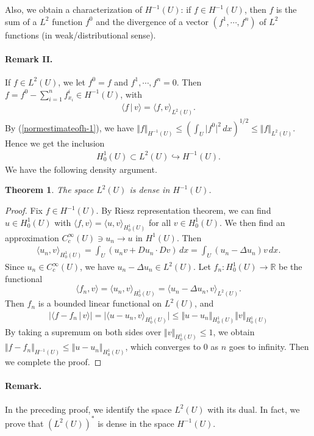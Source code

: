 \documentclass{article}
\numberwithin{equation}{section}
\newcommand{\bbR}{\mathbb{R}}
\theoremstyle{plain}
\newtheorem{theorem}{Theorem}[section]
\theoremstyle{definition}
\begin{document}
Also, we obtain a characterization of $H^{-1}(U)$: if $f\in H^{-1}(U)$, then $f$ is the sum of a $L^2$ function $f^0$ and the divergence of a vector $(f^1,\cdots,f^n)$ of $L^2$ functions (in weak/distributional sense). 

\paragraph{Remark II.} If $f\in L^2(U)$, we let $f^0=f$ and $f^1,\cdots,f^n=0$. Then $f=f^0-\sum_{i=1}^n f_{x_i}^i\in H^{-1}(U)$, with
\begin{align*}
	\langle f\,|\,v\rangle=\langle f,v\rangle_{L^2(U)}.
\end{align*}
By (\ref{normestimateofh-1}), we have $\Vert f\Vert_{H^{-1}(U)}\leq\left(\int_U\vert f^0\vert^2\,dx\right)^{1/2}\leq\Vert f\Vert_{L^2(U)}$. Hence we get the inclusion
\begin{align*}
	H^1_0(U)\subset L^2(U)\hookrightarrow H^{-1}(U).
\end{align*}
We have the following density argument.

\begin{theorem}
The space $L^2(U)$ is dense in $H^{-1}(U)$.
\end{theorem}
\begin{proof}
Fix $f\in H^{-1}(U)$. By Riesz representation theorem, we can find $u\in H_0^1(U)$ with $\langle f,v\rangle=\langle u,v\rangle_{H_0^1(U)}$ for all $v\in H_0^1(U)$. We then find an approximation $C_c^\infty(U)\ni u_n\to u$ in $H^1(U)$. Then
\begin{align*}
	\langle u_n,v\rangle_{H_0^1(U)}=\int_U(u_nv+Du_n\cdot Dv)\,dx=\int_U(u_n-\Delta u_n)v\,dx.\tag{integration by parts}
\end{align*}
Since $u_n\in C_c^\infty(U)$, we have $u_n-\Delta u_n\in L^2(U)$. Let $f_n:H_0^1(U)\to\bbR$ be the functional $$\langle f_n,v\rangle=\langle u_n,v\rangle_{H_0^1(U)}=\langle u_n-\Delta u_n,v\rangle_{L^2(U)}.$$ 
Then $f_n$ is a bounded linear functional on $L^2(U)$, and
\begin{align*}
	\vert\langle f-f_n\,|\,v\rangle\vert=\vert\langle u-u_n,v\rangle_{H_0^1(U)}\vert\leq\Vert u-u_n\Vert_{H_0^1(U)}\Vert v\Vert_{H_0^1(U)}
\end{align*}
By taking a supremum on both sides over $\Vert v\Vert_{H_0^1(U)}\leq 1$, we obtain $\Vert f-f_n\Vert_{H^{-1}(U)}\leq\Vert u-u_n\Vert_{H_0^1(U)}$, which converges to $0$ as $n$ goes to infinity. Then we complete the proof.
\end{proof}
\paragraph{Remark.} In the preceding proof, we identify the space $L^2(U)$ with its dual. In fact, we prove that $(L^2(U))^*$ is dense in the space $H^{-1}(U)$.
\end{document}
